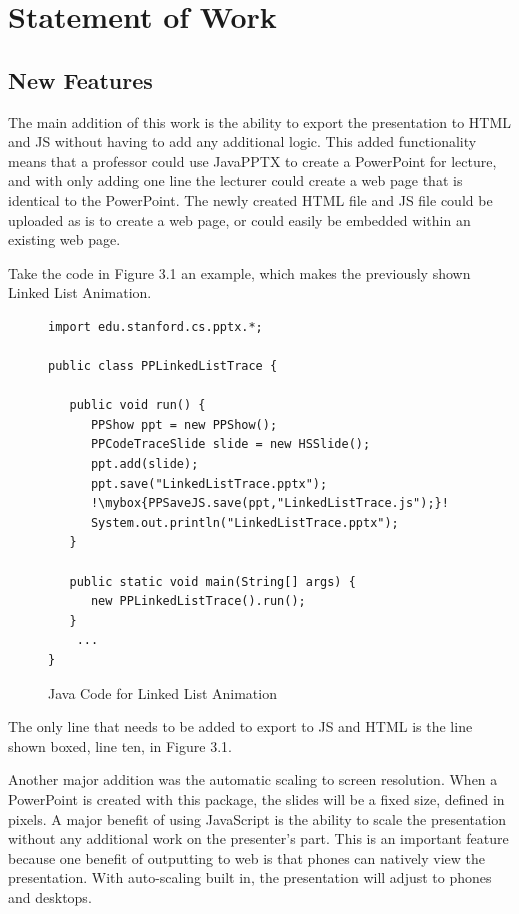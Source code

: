 \documentclass[12pt,twoside]{reedthesis}
\newcommand{\mybox}{%
    \collectbox{%
        \setlength{\fboxsep}{2pt}%
        \fbox{\BOXCONTENT}%
    }%
}
\begin{document}
\section{Statement of Work}

\subsection{New Features}
The main addition of this work is the ability to export the presentation to HTML and JS without having to add any additional logic. This added functionality means that a professor could use JavaPPTX to create a PowerPoint for lecture, and with only adding one line the lecturer could create a web page that is identical to the PowerPoint. The newly created HTML file and JS file could be uploaded as is to create a web page, or could easily be embedded within an existing web page. 

Take the code in Figure 3.1 an example, which makes the previously shown Linked List Animation.
\begin{figure}[h!tbp]
\caption{Java Code for Linked List Animation} 
\begin{lstlisting}[escapechar=!]
import edu.stanford.cs.pptx.*;

public class PPLinkedListTrace {

   public void run() {
      PPShow ppt = new PPShow();
      PPCodeTraceSlide slide = new HSSlide();
      ppt.add(slide);
      ppt.save("LinkedListTrace.pptx");
      !\mybox{PPSaveJS.save(ppt,"LinkedListTrace.js");}!
      System.out.println("LinkedListTrace.pptx");
   }

   public static void main(String[] args) {
      new PPLinkedListTrace().run();
   }
	...
}
\end{lstlisting}
\end{figure}
The only line that needs to be added to export to JS and HTML is the line shown boxed, line ten, in Figure 3.1.

Another major addition was the automatic scaling to screen resolution. When a PowerPoint is created with this package, the slides will be a fixed size, defined in pixels. A major benefit of using JavaScript is the ability to scale the presentation without any additional work on the presenter's part. This is an important feature because one benefit of outputting to web is that phones can natively view the presentation. With auto-scaling built in, the presentation will adjust to phones and desktops. 
\end{document}
